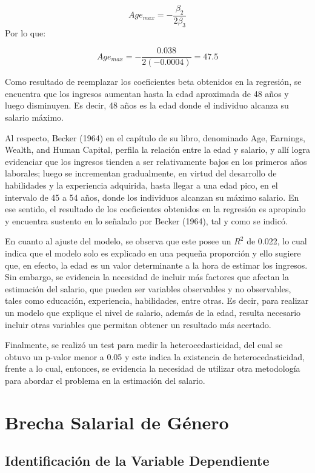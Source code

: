 \documentclass[12pt,a4paper,onecolumn]{article}
\begin{document}
$$Age_{max}= -\frac{\beta_2}{2\beta_3}$$
Por lo que:

$$Age_{max}= - \frac{0.038}{2(-0.0004)} = 47.5$$

Como resultado de reemplazar los coeficientes beta obtenidos en la regresión, se encuentra que los ingresos aumentan hasta la edad aproximada de 48 años y luego disminuyen. Es decir, 48 años es la edad donde el individuo alcanza su salario máximo.

Al respecto, Becker (1964) en el capítulo de su libro, denominado Age, Earnings, Wealth, and Human Capital, perfila la relación entre la edad y salario, y allí logra evidenciar que los ingresos tienden a ser relativamente bajos en los primeros años laborales; luego se incrementan gradualmente, en virtud del desarrollo de habilidades y la experiencia adquirida, hasta llegar a una edad pico, en el intervalo de 45 a 54 años, donde los individuos alcanzan su máximo salario. En ese sentido, el resultado de los coeficientes obtenidos en la regresión es apropiado y encuentra sustento en lo señalado por Becker (1964), tal y como se indicó.

En cuanto al ajuste del modelo, se observa que este posee un $R^2$ de 0.022, lo cual indica que el modelo solo es explicado en una pequeña proporción y ello sugiere que, en efecto, la edad es un valor determinante a la hora de estimar los ingresos. Sin embargo, se evidencia la necesidad de incluir más factores que afectan la estimación del salario, que pueden ser variables observables y no observables, tales como educación, experiencia, habilidades, entre otras. Es decir, para realizar un modelo que explique el nivel de salario, además de la edad, resulta necesario incluir otras variables que permitan obtener un resultado más acertado.

Finalmente, se realizó un test para medir la heterocedasticidad, del cual se obtuvo un p-valor menor a 0.05 y este indica la existencia de heterocedasticidad, frente a lo cual, entonces, se evidencia la necesidad de utilizar otra metodología para abordar el problema en la estimación del salario.

\section{Brecha Salarial de Género}

\subsection{Identificación de la Variable Dependiente}
\end{document}
